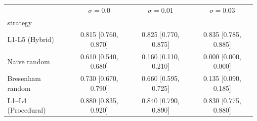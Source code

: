 \begin{tabular}{lccc}
\toprule
 & $\sigma=0.0$ & $\sigma=0.01$ & $\sigma=0.03$ \\
strategy &  &  &  \\
\midrule
L1-L5 (Hybrid) & 0.815 [0.760, 0.870] & 0.825 [0.770, 0.875] & 0.835 [0.785, 0.885] \\
Naive random & 0.610 [0.540, 0.680] & 0.160 [0.110, 0.210] & 0.000 [0.000, 0.000] \\
Bresenham random & 0.730 [0.670, 0.790] & 0.660 [0.595, 0.725] & 0.135 [0.090, 0.185] \\
L1–L4 (Procedural) & 0.880 [0.835, 0.920] & 0.840 [0.790, 0.890] & 0.830 [0.775, 0.880] \\
\bottomrule
\end{tabular}
